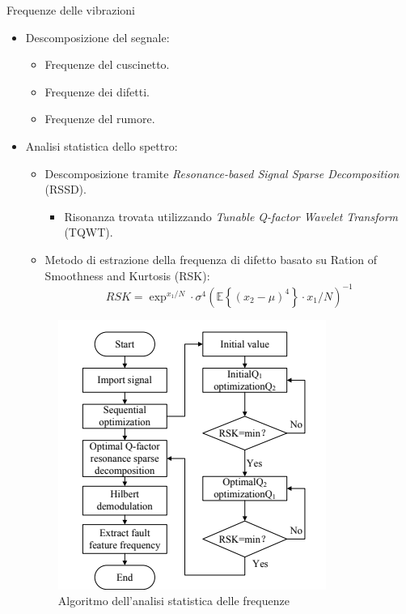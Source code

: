 \documentclass{beamer}
\begin{document}
\begin{frame}[allowframebreaks]{Frequenze delle vibrazioni}
    \begin{itemize}
        \item Descomposizione del segnale\cite{tang2019fault}:
        \begin{itemize}
            \item Frequenze del cuscinetto.
            \item Frequenze dei difetti.
            \item Frequenze del rumore.
        \end{itemize}
        \item Analisi statistica dello spettro\cite{xue2022fault}:
        \begin{itemize}
            \item Descomposizione tramite \textit{Resonance-based Signal Sparse Decomposition} (RSSD).
            \begin{itemize}
                \item Risonanza trovata utilizzando \textit{Tunable Q-factor Wavelet Transform} (TQWT).
            \end{itemize}
            \item Metodo di estrazione della frequenza di difetto basato su Ration of Smoothness and Kurtosis (RSK): $$\mathit{RSK} = \exp^{x_1/N} \cdot \sigma^4 \left( \mathbb{E}\left\{ (x_2 - \mu)^4 \right\} \cdot x_1 / N \right)^{-1}$$
        \end{itemize}

        \begin{figure}
            \centering
            \includegraphics[height=0.7\textheight]{Figures/RSK_RSSD.png}
            \caption{Algoritmo dell'analisi statistica delle frequenze}
            \label{fig:RSK_RSSD}
        \end{figure}


\end{itemize}
\end{frame}
\end{document}
